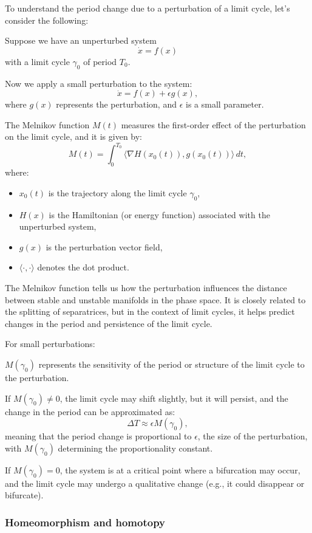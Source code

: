 \documentclass{article}
\theoremstyle{definition}
\theoremstyle{remark}
\newcounter{ct}
\begin{document}
To understand the period change due to a perturbation of a limit cycle, let’s consider the following:

Suppose we have an unperturbed system
\[
\dot{x} = f(x)
\]
with a limit cycle \(\gamma_0\) of period \(T_0\).

Now we apply a small perturbation to the system:
\[
\dot{x} = f(x) + \epsilon g(x),
\]
where \(g(x)\) represents the perturbation, and \(\epsilon\) is a small parameter.

The Melnikov function \(M(t)\) measures the first-order effect of the perturbation on the limit cycle, and it is given by:
\[
M(t) = \int_0^{T_0} \langle \nabla H(x_0(t)), g(x_0(t)) \rangle \, dt,
\]
where:
\begin{itemize}
    \item \(x_0(t)\) is the trajectory along the limit cycle \(\gamma_0\),
    \item \(H(x)\) is the Hamiltonian (or energy function) associated with the unperturbed system,
    \item \(g(x)\) is the perturbation vector field,
    \item \(\langle \cdot, \cdot \rangle\) denotes the dot product.
\end{itemize}

The Melnikov function tells us how the perturbation influences the distance between stable and unstable manifolds in the phase space. It is closely related to the splitting of separatrices, but in the context of limit cycles, it helps predict changes in the period and persistence of the limit cycle.

For small perturbations:

\(M(\gamma_0)\) represents the sensitivity of the period or structure of the limit cycle to the perturbation.

If \(M(\gamma_0) \neq 0\), the limit cycle may shift slightly, but it will persist, and the change in the period can be approximated as:
\[
\Delta T \approx \epsilon M(\gamma_0),
\]
meaning that the period change is proportional to \(\epsilon\), the size of the perturbation, with \(M(\gamma_0)\) determining the proportionality constant.

If \(M(\gamma_0) = 0\), the system is at a critical point where a bifurcation may occur, and the limit cycle may undergo a qualitative change (e.g., it could disappear or bifurcate).



\subsubsection{Homeomorphism and homotopy}
\end{document}
